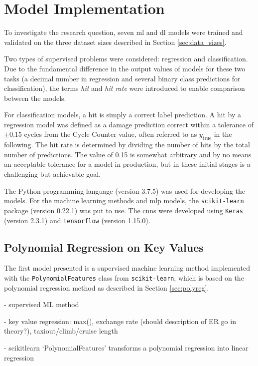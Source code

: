 \section{Model Implementation} \label{sec:practical}
To investigate the research question, seven \ac{ml} and \ac{dl} models were trained and validated on the three dataset sizes described in Section \ref{sec:data_sizes}.

Two types of supervised problems were considered: regression and classification. Due to the fundamental difference in the output values of models for these two tasks (a decimal number in regression and several binary class predictions for classification), the terms \textit{hit} and \textit{hit rate} were introduced to enable comparison between the models.

For classification models, a hit is simply a correct label prediction. A hit by a regression model was defined as a damage prediction correct within a tolerance of \(\pm0.15\) cycles from the Cycle Counter value, often referred to as \(y_\text{true}\) in the following. The hit rate is determined by dividing the number of hits by the total number of predictions. The value of 0.15 is somewhat arbitrary and by no means an acceptable tolerance for a model in production, but in these initial stages is a challenging but achievable goal.

The Python programming language (version 3.7.5) was used for developing the models. For the machine learning methods and \ac{mlp} models, the \texttt{scikit-learn} package (version 0.22.1) was put to use. The \ac{cnn}s were developed using \texttt{Keras} (version 2.3.1) and \texttt{tensorflow} (version 1.15.0).

\subsection{Polynomial Regression on Key Values}
The first model presented is a supervised machine learning method implemented with the \texttt{PolynomialFeatures} class from \texttt{scikit-learn}, which is based on the polynomial regression method as described in Section \ref{sec:polyreg}.

- supervised ML method

- key value regression: max(), exchange rate (should description of ER go in theory?), taxiout/climb/cruise length

- scikitlearn `PolynomialFeatures' transforms a polynomial regression into linear regression

